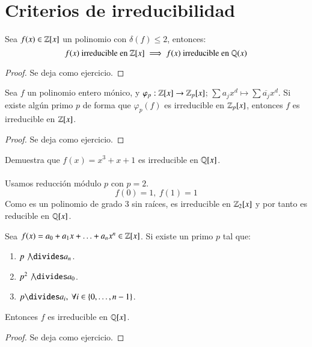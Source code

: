 \section{Criterios de irreducibilidad}

\begin{lm}[de Gauss]
    Sea $f(x) \in \mathbb{Z}[x]$ un polinomio con $\delta(f) \leq 2$, entonces:
    $$
        f(x) \text{ irreducible en } \mathbb{Z}[x] \implies f(x) \text{ irreducible en } \mathbb{Q}(x)
    $$
\end{lm}
\begin{proof}
    Se deja como ejercicio.
\end{proof}


\begin{lm}
    Sea $f$ un polinomio entero mónico, y $\varphi_p: \mathbb{Z}[x] \to \mathbb{Z}_p[x]$; $\sum a_jx^d \mapsto \sum \overline{a_j}x^d$. Si existe algún primo $p$ de forma que $\varphi_p(f)$ es irreducible en $\mathbb{Z}_p[x]$, entonces $f$ es irreducible en $\mathbb{Z}[x]$.
\end{lm}
\begin{proof}
    Se deja como ejercicio.
\end{proof}

\begin{ex}[H1.34 (c)]
    Demuestra que $f(x) = x^3+x+1$ es irreducible en $\mathbb{Q}[x]$.\\\\
    Usamos reducción módulo $p$ con $p = 2$.
    $$
        f(0) = 1,\ f(1) = 1
    $$
    Como es un polinomio de grado $3$ sin raíces, es irreducible en $\mathbb{Z}_2[x]$ y por tanto es reducible en $\mathbb{Q}[x]$.
\end{ex}

\begin{thm}\label{thm:Einsestein}
    Sea $f(x) = a_0 + a_1 x + \ldots + a_n x^n \in \mathbb{Z}[x]$. Si existe un primo $p$ tal que:
    \begin{enumerate}
        \item $p \not \divides a_n$.
        \item $p^2 \not \divides a_0$.
        \item $p \divides a_i,\ \forall i \in \setdef{0, \ldots, n-1} $.
    \end{enumerate}
    Entonces $f$ es irreducible en $\mathbb{Q}[x]$.
\end{thm}
\begin{proof}
    Se deja como ejercicio.
\end{proof}

